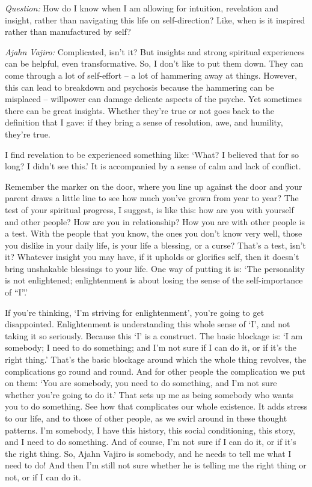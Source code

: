 \bigskip

\emph{Question:} How do I know when I am allowing for intuition, revelation and insight,
rather than navigating this life on self-direction? Like, when is it inspired
rather than manufactured by self?

\emph{Ajahn Vajiro:} Complicated, isn't it? But insights and strong spiritual
experiences can be helpful, even transformative. So, I don't like to put them
down. They can come through a lot of self-effort -- a lot of hammering away at
things. However, this can lead to breakdown and psychosis because the hammering
can be misplaced -- willpower can damage delicate aspects of the psyche. Yet
sometimes there can be great insights. Whether they're true or not goes back to
the definition that I gave: if they bring a sense of resolution, awe, and
humility, they're true.

I find revelation to be experienced something like: `What? I believed that for so long? I didn't see this.' It is accompanied by a sense of calm and lack of conflict.

Remember the marker on the door, where you line up against the door and your
parent draws a little line to see how much you've grown from year to year? The
test of your spiritual progress, I suggest, is like this: how are you with yourself and
other people? How are you in relationship? How you are with other people is a
test. With the people that you know, the ones you don't know very well, those
you dislike in your daily life, is your life a blessing, or a
curse? That's a test, isn't it? Whatever insight you may have, if it
upholds or glorifies self, then it doesn't bring unshakable blessings to your life. One
way of putting it is: `The personality is not enlightened; enlightenment is
about losing the sense of the self-importance of ``I''.'

If you're thinking, `I'm striving for enlightenment', you're going to get
disappointed. Enlightenment is understanding this whole sense of `I', and not
taking it so seriously. Because this `I' is a construct. The basic blockage is:
`I am somebody; I need to do something; and I'm not sure if I can do it, or if
it's the right thing.' That's the basic blockage around which the whole thing
revolves, the complications go round and round. And for other people the complication we put on them: `You are somebody, you need
to do something, and I'm not sure whether you're going to do it.' That sets up
me as being somebody who wants you to do something. See how that complicates our
whole existence. It adds stress to our life, and to those of other people, as we
swirl around in these thought patterns. I'm somebody, I have this history, this social
conditioning, this story, and I need to do something. And of course, I'm not
sure if I can do it, or if it's the right thing. So, Ajahn Vajiro is somebody,
and he needs to tell me what I need to do! And then I'm still not sure whether he is telling me
the right thing or not, or if I can do it.


